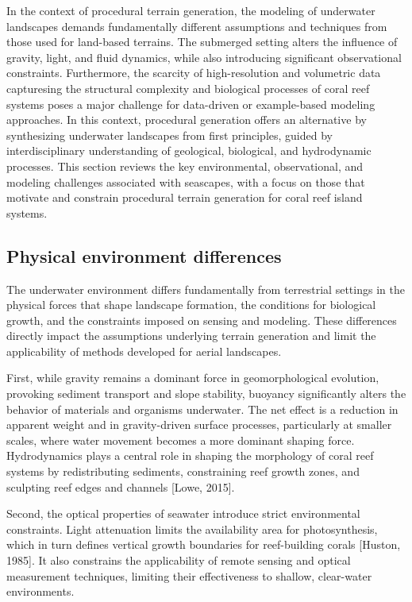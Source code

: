 In the context of procedural terrain generation, the modeling of underwater landscapes demands fundamentally different assumptions and techniques from those used for land-based terrains. The submerged setting alters the influence of gravity, light, and fluid dynamics, while also introducing significant observational constraints. Furthermore, the scarcity of high-resolution and volumetric data capturesing the structural complexity and biological processes of coral reef systems poses a major challenge for data-driven or example-based modeling approaches. In this context, procedural generation offers an alternative by synthesizing underwater landscapes from first principles, guided by interdisciplinary understanding of geological, biological, and hydrodynamic processes. This section reviews the key environmental, observational, and modeling challenges associated with seascapes, with a focus on those that motivate and constrain procedural terrain generation for coral reef island systems.

\subsection{Physical environment differences}
The underwater environment differs fundamentally from terrestrial settings in the physical forces that shape landscape formation, the conditions for biological growth, and the constraints imposed on sensing and modeling. These differences directly impact the assumptions underlying terrain generation and limit the applicability of methods developed for aerial landscapes.

First, while gravity remains a dominant force in geomorphological evolution, provoking sediment transport and slope stability, buoyancy significantly alters the behavior of materials and organisms underwater. The net effect is a reduction in apparent weight and in gravity-driven surface processes, particularly at smaller scales, where water movement becomes a more dominant shaping force. Hydrodynamics plays a central role in shaping the morphology of coral reef systems by redistributing sediments, constraining reef growth zones, and sculpting reef edges and channels [Lowe, 2015].

Second, the optical properties of seawater introduce strict environmental constraints. Light attenuation limits the availability area for photosynthesis, which in turn defines vertical growth boundaries for reef-building corals [Huston, 1985]. It also constrains the applicability of remote sensing and optical measurement techniques, limiting their effectiveness to shallow, clear-water environments.

